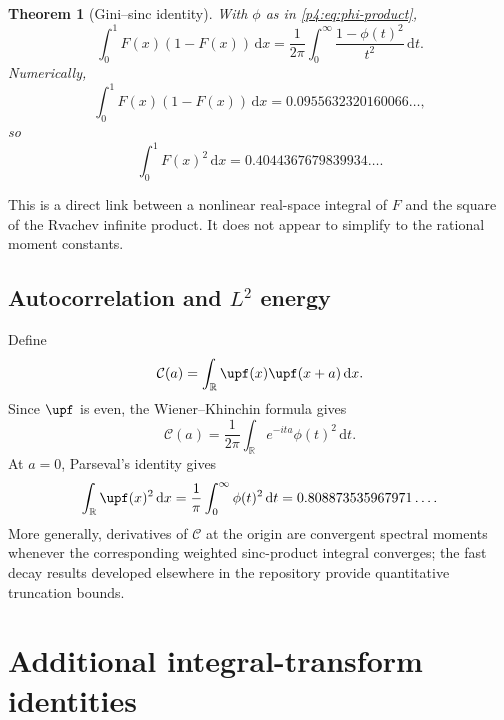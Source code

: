 \documentclass[11pt,oneside]{article}
\newtheorem{theorem}{Theorem}[section]
\theoremstyle{definition}
\theoremstyle{remark}
\newcommand{\F}{F}
\newcommand{\R}{\mathbb R}
\newcommand{\dd}{\,\mathrm d}
\newcommand{\1}{\mathbf 1}
\begin{document}
\begin{theorem}[Gini--sinc identity]\label{p4:thm:gini-sinc}
With \(\phi\) as in \cref{p4:eq:phi-product},
\begin{equation}\label{p4:eq:Gini-sinc}
 \boxed{\displaystyle
 \int_0^1\F(x)(1-\F(x))\dd x
 =\frac1{2\pi}\int_0^\infty
 \frac{1-\phi(t)^2}{t^2}\dd t.}
\end{equation}
Numerically,
\begin{equation}\label{p4:eq:Gini-numeric}
 \int_0^1\F(x)(1-\F(x))\dd x
 =0.0955632320160066\ldots,
\end{equation}
so
\begin{equation}\label{p4:eq:F2-numeric}
 \int_0^1\F(x)^2\dd x
 =0.4044367679839934\ldots.
\end{equation}
\end{theorem}

This is a direct link between a nonlinear real-space integral of \(\F\) and the square
of the Rvachev infinite product.  It does not appear to simplify to the rational moment
constants.

\subsection{Autocorrelation and \(L^2\) energy}

Define
\begin{equation}\label{p4:eq:Cautocorr}
 \mathcal C(a)=\int_\R\upf(x)\upf(x+a)\dd x.
\end{equation}
Since \(\upf\) is even, the Wiener--Khinchin formula gives
\begin{equation}\label{p4:eq:autocorr-Fourier}
 \mathcal C(a)=\frac1{2\pi}
 \int_\R e^{-ita}\phi(t)^2\dd t.
\end{equation}
At \(a=0\), Parseval's identity gives
\begin{equation}\label{p4:eq:up-L2}
 \int_\R\upf(x)^2\dd x
 =\frac1\pi\int_0^\infty\phi(t)^2\dd t
 =0.808873535967971\ldots.
\end{equation}
More generally, derivatives of \(\mathcal C\) at the origin are convergent spectral
moments whenever the corresponding weighted sinc-product integral converges; the fast
decay results developed elsewhere in the repository provide quantitative truncation
bounds.

\section{Additional integral-transform identities}
\end{document}
